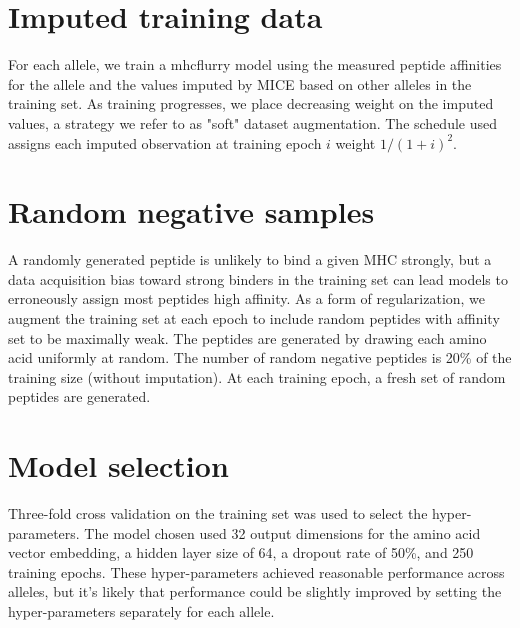 \section{Imputed training data}
For each allele, we train a mhcflurry model using the measured peptide affinities for the allele and the values imputed by MICE based on other alleles in the training set. As training progresses, we place decreasing weight on the imputed values, a strategy we refer to as "soft" dataset augmentation. The schedule used assigns each imputed observation at training epoch $i$ weight $1 / (1 + i)^2$.

\section{Random negative samples}
A randomly generated peptide is unlikely to bind a given MHC strongly, but a data acquisition bias toward strong binders in the training set can lead models to erroneously assign most peptides high affinity. As a form of regularization, we augment the training set at each epoch to include random peptides with affinity set to be maximally weak. The peptides are generated by drawing each amino acid uniformly at random. The number of random negative peptides is 20\% of the training size (without imputation). At each training epoch, a fresh set of random peptides are generated.

\section{Model selection}
Three-fold cross validation on the training set was used to select the hyper-parameters. The model chosen used 32 output dimensions for the amino acid vector embedding, a hidden layer size of 64, a dropout rate\cite{Srivastava2014} of 50\%, and 250 training epochs. These hyper-parameters achieved reasonable performance across alleles, but it's likely that performance could be slightly improved by setting the hyper-parameters separately for each allele.